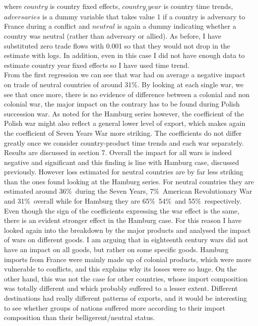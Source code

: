 \documentclass[12pt,a4paper,titlepage]{article}
\begin{document}
where $country$ is country fixed effects, $country_iyear$ is country time trends, $adversaries$ is a dummy variable that takes value 1 if a country is adversary to France during a conflict and $neutral$ is again a dummy indicating whether a country was neutral (rather than adversary or allied). As before, I have substituted zero trade flows with 0.001 so that they would not drop in the estimate with logs. In addition, even in this case I did not have enough data to estimate country year fixed effects so I have used time trend.\\
From the first regression we can see that war had on average a negative impact on trade of neutral countries of around 31\%. By looking at each single war, we see that once more, there is no evidence of difference between a colonial and non colonial war, the major impact on the contrary has to be found during Polish succession war. As noted for the Hamburg series however, the coefficient of the Polish war might also reflect a general lower level of export, which makes again the coefficient of Seven Years War more striking. The coefficients do not differ greatly once we consider country-product time trends and each war separately. Results are discussed in section 7. Overall the impact for all wars is indeed negative and significant and this finding is line with Hamburg case, discussed previously. However loss estimated for neutral countries are by far less striking than the ones found looking at the Hamburg series. For neutral countries they are estimated around 36\%\ during the Seven Years, 7\%\ American Revolutionary War and 31\%\ overall while for Hamburg they are 65\%\, 54\%\ and 55\%\ respectively. Even though the sign of the coefficients expressing the war effect is the same, there is an evident stronger effect in the Hamburg case. For this reason I have looked again into the breakdown by the major products and analysed the impact of wars on different goods. I am arguing that in eighteenth century wars did not have an impact on all goods, but rather on some specific goods. Hamburg imports from France were mainly made up of colonial products, which were more vulnerable to conflicts, and this explains why its losses were so huge. On the other hand, this was not the case for other countries, whose import composition was totally different and which probably suffered to a lesser extent. Different destinations had really different patterns of exports, and it would be interesting to see whether groups of nations suffered more according to their import composition than their belligerent/neutral status. 
\end{document}

